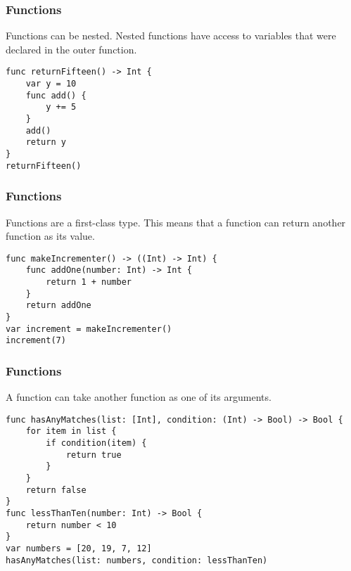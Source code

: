 \begin{frame}[fragile] \frametitle{Functions}
Functions can be nested. Nested functions have access to variables that were declared in the outer function.


\begin{lstlisting}[basicstyle=\scriptsize]
func returnFifteen() -> Int {
    var y = 10
    func add() {
        y += 5
    }
    add()
    return y
}
returnFifteen()
\end{lstlisting}


\end{frame}

\begin{frame}[fragile] \frametitle{Functions}

Functions are a first-class type. This means that a function can return another function as its value.
\begin{lstlisting}[basicstyle=\scriptsize]
func makeIncrementer() -> ((Int) -> Int) {
    func addOne(number: Int) -> Int {
        return 1 + number
    }
    return addOne
}
var increment = makeIncrementer()
increment(7)
\end{lstlisting}

\end{frame}


\begin{frame}[fragile] \frametitle{Functions}
A function can take another function as one of its arguments.

\begin{lstlisting}[basicstyle=\scriptsize]
func hasAnyMatches(list: [Int], condition: (Int) -> Bool) -> Bool {
    for item in list {
        if condition(item) {
            return true
        }
    }
    return false
}
func lessThanTen(number: Int) -> Bool {
    return number < 10
}
var numbers = [20, 19, 7, 12]
hasAnyMatches(list: numbers, condition: lessThanTen)
\end{lstlisting}

\end{frame}



